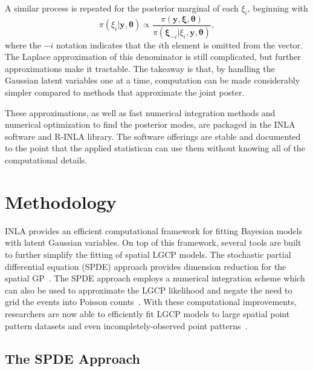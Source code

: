 \documentclass[]{interact}
\begin{document}
A similar process is repeated for the posterior marginal of each \(\xi_{i}\),
beginning with
\begin{displaymath}
\pi\left(\xi_{i} | \mathbf{y}, \boldsymbol{\theta}\right)
\propto \frac{\pi\left(\mathbf{y}, \boldsymbol{\xi}, \boldsymbol{\theta}\right)}
{\pi\left(\boldsymbol{\xi}_{-i} | \xi_{i}, \mathbf{y}, \boldsymbol{\theta}\right)},
\end{displaymath}
where the \(-i\) notation indicates that the \(i\)th element is omitted from
the vector. The Laplace approximation of this denominator is still complicated,
but further approximations make it tractable. The takeaway is that, by
handling the Gaussian latent variables one at a time, computation can be made
considerably simpler compared to methods that approximate the joint poster.

These approximations, as well as fast numerical integration methods and
numerical optimization to find the posterior modes, are packaged in the INLA
software and R-INLA library. The software offerings are stable and documented
to the point that the applied statistican can use them without knowing all of
the computational details.


\section{Methodology}
\label{methods}

INLA provides an efficient computational framework for fitting Bayesian models
with latent Gaussian variables. On top of this framework, several tools are
built to further simplify the fitting of spatial LGCP models. The stochastic
partial differential equation (SPDE) approach provides dimension reduction for
the spatial GP~\cite{lindgrenetal}. The SPDE approach employs a numerical
integration scheme which can also be used to approximate the LGCP likelihood
and negate the need to grid the events into Poisson counts~\cite{simpsonetal}.
With these computational improvements, researchers are now able to efficiently
fit LGCP models to large spatial point pattern datasets and even
incompletely-observed point patterns~\cite{yuanetal}.  


\subsection{The SPDE Approach}
\label{spde}
\end{document}
